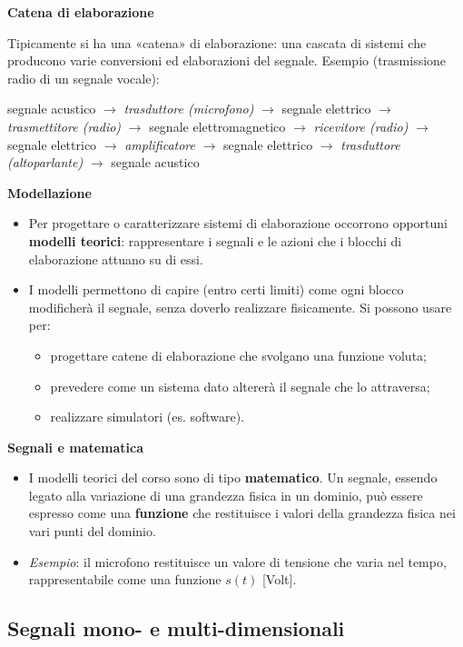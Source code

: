 \documentclass[12pt, a4paper]{article}
\begin{document}
\textbf{Catena di elaborazione}

Tipicamente si ha una «catena» di elaborazione: una cascata di sistemi che producono varie conversioni ed elaborazioni del segnale. Esempio (trasmissione radio di un segnale vocale):

\begin{center}
\small
segnale acustico $\to$ \textit{trasduttore (microfono)} $\to$ segnale elettrico $\to$ \textit{trasmettitore (radio)} $\to$ segnale elettromagnetico $\to$ \textit{ricevitore (radio)} $\to$ segnale elettrico $\to$ \textit{amplificatore} $\to$ segnale elettrico $\to$ \textit{trasduttore (altoparlante)} $\to$ segnale acustico
\end{center}

\textbf{Modellazione}
\begin{itemize}
    \item Per progettare o caratterizzare sistemi di elaborazione occorrono opportuni \textbf{modelli teorici}: rappresentare i segnali e le azioni che i blocchi di elaborazione attuano su di essi.
    \item I modelli permettono di capire (entro certi limiti) come ogni blocco modificherà il segnale, senza doverlo realizzare fisicamente. Si possono usare per:
    \begin{itemize}
        \item progettare catene di elaborazione che svolgano una funzione voluta;
        \item prevedere come un sistema dato altererà il segnale che lo attraversa;
        \item realizzare simulatori (es. software).
    \end{itemize}
\end{itemize}

\textbf{Segnali e matematica}
\begin{itemize}
    \item I modelli teorici del corso sono di tipo \textbf{matematico}. Un segnale, essendo legato alla variazione di una grandezza fisica in un dominio, può essere espresso come una \textbf{funzione} che restituisce i valori della grandezza fisica nei vari punti del dominio.
    \item \textit{Esempio}: il microfono restituisce un valore di tensione che varia nel tempo, rappresentabile come una funzione $s(t)$ [Volt].
\end{itemize}

\subsection{Segnali mono- e multi-dimensionali}
\end{document}
